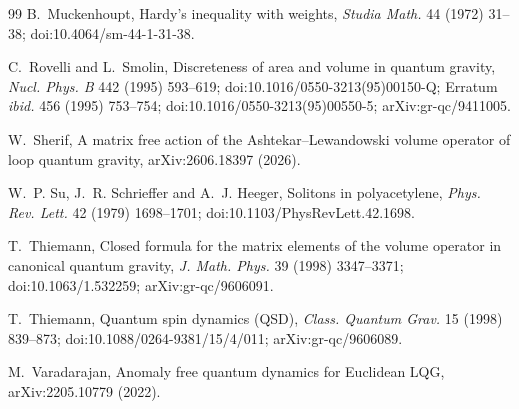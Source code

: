\begin{thebibliography}{99}
B.~Muckenhoupt, Hardy's inequality with weights, \emph{Studia Math.} 44 (1972) 31--38;
doi:10.4064/sm-44-1-31-38.

C.~Rovelli and L.~Smolin, Discreteness of area and volume in quantum gravity, \emph{Nucl. Phys.
B} 442 (1995) 593--619; doi:10.1016/0550-3213(95)00150-Q; Erratum \emph{ibid.} 456 (1995)
753--754; doi:10.1016/0550-3213(95)00550-5; arXiv:gr-qc/9411005.

W.~Sherif, A matrix free action of the Ashtekar--Lewandowski volume operator of loop quantum
gravity, arXiv:2606.18397 (2026).

W.~P. Su, J.~R. Schrieffer and A.~J. Heeger, Solitons in polyacetylene, \emph{Phys. Rev. Lett.}
42 (1979) 1698--1701; doi:10.1103/PhysRevLett.42.1698.

T.~Thiemann, Closed formula for the matrix elements of the volume operator in canonical quantum
gravity, \emph{J. Math. Phys.} 39 (1998) 3347--3371; doi:10.1063/1.532259; arXiv:gr-qc/9606091.

T.~Thiemann, Quantum spin dynamics (QSD), \emph{Class. Quantum Grav.} 15 (1998) 839--873;
doi:10.1088/0264-9381/15/4/011; arXiv:gr-qc/9606089.

M.~Varadarajan, Anomaly free quantum dynamics for Euclidean LQG, arXiv:2205.10779 (2022).

\end{thebibliography}
